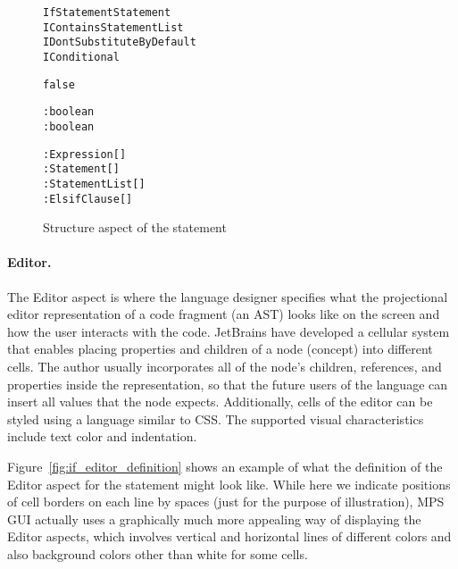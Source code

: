 \begin{figure}[ht]
\centering
\begin{alltt}
\small
{} IfStatement  Statement
         IContainsStatementList
                   IDontSubstituteByDefault
                   IConditional

   false
   
   

     : boolean
   : boolean
  
          : Expression[]
   : Statement[]
             : StatementList[]
       : ElsifClause[]
  
\end{alltt}
\caption{Structure aspect of the  statement}
\label{fig:if_statement_structure}
\end{figure}

\paragraph{Editor.}
The Editor aspect is where the language designer specifies what the projectional editor representation of a code fragment (an AST) looks like on the screen and how the user interacts with the code.
JetBrains have developed a cellular system that enables placing properties and children of a node (concept) into different cells.
The author usually incorporates all of the node's children, references, and properties inside the representation, so that the future users of the language can insert all values that the node expects.
Additionally, cells of the editor can be styled using a language similar to CSS.
The supported visual characteristics include text color and indentation.

Figure~\ref{fig:if_editor_definition} shows an example of what the definition of the Editor aspect for the  statement might look like.
While here we indicate positions of cell borders on each line by spaces (just for the purpose of illustration), MPS GUI actually uses a graphically much more appealing way of displaying the Editor aspects, which involves vertical and horizontal lines of different colors and also background colors other than white for some cells.
	

